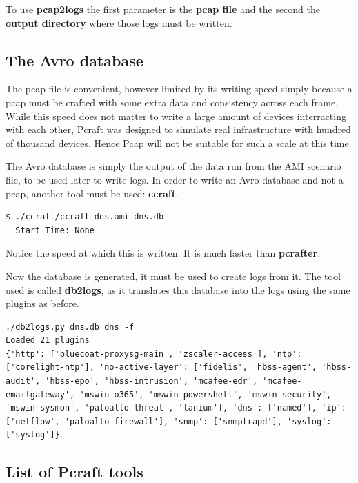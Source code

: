 \documentclass[10pt]{article}
\begin{document}
To use \textbf{pcap2logs} the first parameter is the \textbf{pcap file} and the second the \textbf{output directory} where those logs must be written.

\subsection{The Avro database}

The pcap file is convenient, however limited by its writing speed simply because a pcap must be crafted with some extra data and consistency across each frame. While this speed does not matter to write a large amount of devices interracting with each other, Pcraft was designed to simulate real infrastructure with hundred of thousand devices. Hence Pcap will not be suitable for such a scale at this time.

The Avro database is simply the output of the data run from the AMI scenario file, to be used later to write logs. In order to write an Avro database and not a pcap, another tool must be used: \textbf{ccraft}.

\begin{lstlisting}[caption={Creating an Avro database},captionpos=b]
  $ ./ccraft/ccraft dns.ami dns.db
  Start Time: None
\end{lstlisting}

Notice the speed at which this is written. It is much faster than \textbf{pcrafter}.

Now the database is generated, it must be used to create logs from it. The tool used is called \textbf{db2logs}, as it translates this database into the logs using the same plugins as before.

\begin{lstlisting}[caption={Genering logs from an Avro database},captionpos=b]
./db2logs.py dns.db dns -f
Loaded 21 plugins
{'http': ['bluecoat-proxysg-main', 'zscaler-access'], 'ntp': ['corelight-ntp'], 'no-active-layer': ['fidelis', 'hbss-agent', 'hbss-audit', 'hbss-epo', 'hbss-intrusion', 'mcafee-edr', 'mcafee-emailgateway', 'mswin-o365', 'mswin-powershell', 'mswin-security', 'mswin-sysmon', 'paloalto-threat', 'tanium'], 'dns': ['named'], 'ip': ['netflow', 'paloalto-firewall'], 'snmp': ['snmptrapd'], 'syslog': ['syslog']}
\end{lstlisting}

\subsection{List of Pcraft tools}
\end{document}
